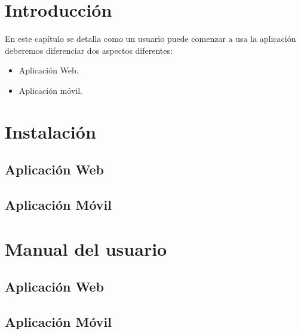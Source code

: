
\section{Introducción}\label{introduccion-usuario}
En este capítulo se detalla como un usuario puede comenzar a usa la aplicación 
deberemos diferenciar dos aspectos diferentes:

\begin{itemize}
\tightlist
\item
  Aplicación Web.
\item
  Aplicación móvil.
\end{itemize}

\section{Instalación}\label{instalacion-app}

\subsection{Aplicación Web}\label{aweb}

\subsection{Aplicación Móvil}\label{amovil}

\section{Manual del usuario}\label{manual-usuario}

\subsection{Aplicación Web}\label{aweb}

\subsection{Aplicación Móvil}\label{amovil}


